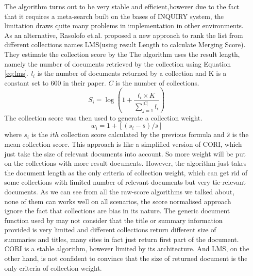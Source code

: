 The algorithm turns out to be very stable and efficient,however due to the fact that it requires a meta-search built on the bases of INQUIRY system, the limitation draws quite many problems in implementation in other environments. As an alternative, Rasolofo et.al. \cite{Rasolofo2001}proposed a new approach to rank the list from different collections names LMS(using result Length to calculate Merging Score). They estimate the collection score by the The algorithm uses the result length, namely the number of documents retrieved by the collection using Equation \eqref{eq:lms}. $l_i$ is the number of documents returned by a collection and K is a constant set to 600 in their paper. $C$ is the number of collections. 
\begin{equation}
\label{eq:lms}
	S_i=\log{(1+\frac{l_i\times{K}}{\sum\nolimits_{j=1}^{|C|}l_i})} 
\end{equation} 
The collection score was then used to generate a collection weight. 
\begin{equation}
\label{eq:lms_weight}
	w_i=1+[(s_i-\bar{s})/\bar{s}] 
\end{equation} 
where $s_i$ is the $ith$ collection score calculated by the previous formula and $\hat{s}$ is the mean collection score. This approach is like a simplified version of CORI, which just take the size of relevant documents into account. So more weight will be put on the collections with more result documents. However, the algorithm just takes the document length as the only criteria of collection weight, which can get rid of some collections with limited number of relevant documents but very tie-relevant documents.
As we can see from all the raw-score algorithms we talked about, none of them can works well on all scenarios, the score normalised approach ignore the fact that collections are bias in its nature. The generic document function used by \cite{Rasolofo2003} may not consider that the title or summary information provided is very limited and different collections return different size of summaries and titles, many sites in fact just return first part of the document. CORI is a stable algorithm, however limited by its architecture. And LMS, on the other hand, is not confident to convince that the size of returned document is the only criteria of collection weight.
